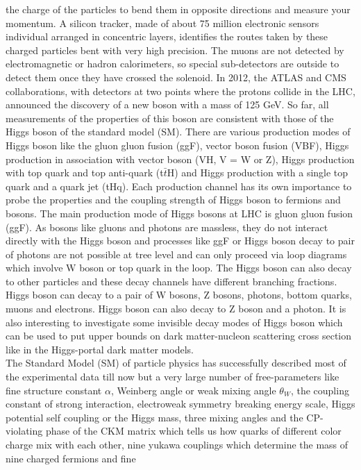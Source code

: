 \documentclass[final,3p]{CSP}
\begin{document}
the charge of the particles to bend them in opposite directions and measure your momentum. A silicon tracker, made of about 75 
million electronic sensors individual arranged in concentric layers, identifies the routes taken by these charged particles 
bent with very high precision. The muons are not detected by electromagnetic or hadron calorimeters, so special sub-detectors 
are outside to detect them once they have crossed the solenoid. In 2012, the ATLAS and CMS collaborations, with detectors at 
two points where the protons collide in the LHC, announced the discovery of a new boson with a mass of 125 GeV. So far, all 
measurements of the properties of this boson are consistent with those of the Higgs boson of the standard model (SM).
There are various production modes of Higgs boson like the gluon gluon fusion (ggF), vector boson fusion (VBF), Higgs 
production in association with vector boson (VH, V = W or Z), Higgs production with top quark and top anti-quark (t$\bar{t}$H) and Higgs 
production with a single top quark and a quark jet (tHq). Each production channel has its own importance to probe the 
properties and the coupling strength of Higgs boson to fermions and bosons. The main production mode of Higgs bosons at LHC is 
gluon gluon fusion (ggF). As bosons like gluons and photons are massless, they do not interact directly with the Higgs boson 
and processes like ggF or Higgs boson decay to pair of photons are not possible at tree level and can only proceed via loop 
diagrams which involve W boson or top quark in the loop. The Higgs boson can also decay to other particles and these decay 
channels have different branching fractions. Higgs boson can decay to a pair of W bosons, Z bosons, photons, bottom quarks, 
muons and electrons. Higgs boson can also decay to Z boson and a photon. It is also interesting to investigate some invisible 
decay modes of Higgs boson which can be used to put upper bounds on dark matter-nucleon scattering cross section like in the 
Higgs-portal dark matter models. \\ 
The Standard Model (SM) of particle physics has successfully described most of the experimental data till now but a very large 
number of free-parameters like fine structure constant $\alpha$, Weinberg angle or weak mixing angle $\theta_W$, the coupling 
constant of strong interaction, electroweak symmetry breaking energy scale, Higgs potential self coupling or the Higgs mass, 
three mixing angles and the CP-violating phase of the CKM matrix which tells us how quarks of 
different color charge mix with 
each other, nine yukawa couplings which determine the mass of nine charged fermions and fine 
\end{document}

